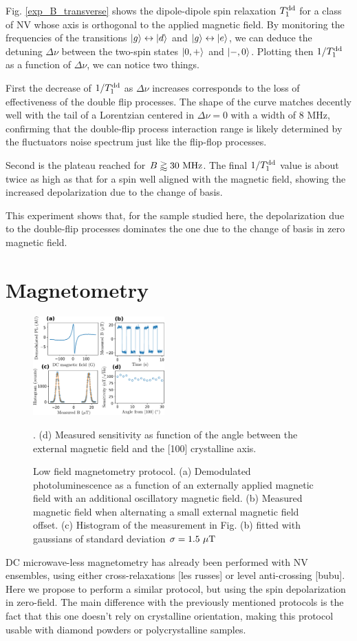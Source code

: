 \documentclass[preprintnumbers,amsmath,amssymb,superscriptaddress,twocolumn,showpacs]{revtex4-2}
\begin{document}
Fig. \ref{exp_B_transverse} shows the dipole-dipole spin relaxation $T_1^{\rm dd}$ for a class of NV whose axis is orthogonal to the applied magnetic field. By monitoring the frequencies of the transitions $\ket{g} \leftrightarrow \ket{d}$ and $\ket{g} \leftrightarrow \ket{e}$, we can deduce the detuning $\Delta \nu$ between the two-spin states $\ket{0,+}$ and $\ket{-,0}$. Plotting then $1/T_1^{\rm dd}$ as a function of $\Delta \nu$, we can notice two things. 

First the decrease of $1/T_1^{\rm dd}$ as $\Delta \nu$ increases corresponds to the loss of effectiveness of the double flip processes. The shape of the curve matches decently well with the tail of a Lorentzian centered in $\Delta \nu=0$ with a width of 8 MHz, confirming that the double-flip process interaction range is likely determined by the fluctuators noise spectrum just like the flip-flop processes. 

Second is the plateau reached for $B \gtrapprox 30\ \rm MHz$. The final $1/T_1^{\rm dd}$ value is about twice as high as that for a spin well aligned with the magnetic field, showing the increased depolarization due to the change of basis.

This experiment shows that, for the sample studied here, the depolarization due to the double-flip processes dominates the one due to the change of basis in zero magnetic field.

\section*{Magnetometry}
\begin{figure}
\includegraphics[width=0.45\textwidth]{Figures/fig_magneto}
\caption{Low field magnetometry protocol. (a) Demodulated photoluminescence as a function of an externally applied magnetic field with an additional oscillatory magnetic field. (b) Measured magnetic field when alternating a small external magnetic field offset. (c) Histogram of the measurement in Fig. (b) fitted with gaussians of standard deviation $\sigma=1.5\ \mu \rm T$}. (d) Measured sensitivity as function of the angle between the external magnetic field and the [100] crystalline axis.
\label{magneto}
\end{figure}
DC microwave-less magnetometry has already been performed with NV ensembles, using either cross-relaxations [les russes] or level anti-crossing [bubu]. Here we propose to perform a similar protocol, but using the spin depolarization in zero-field. The main difference with the previously mentioned protocols is the fact that this one doesn't rely on crystalline orientation, making this protocol usable with diamond powders or polycrystalline samples.
\end{document}
